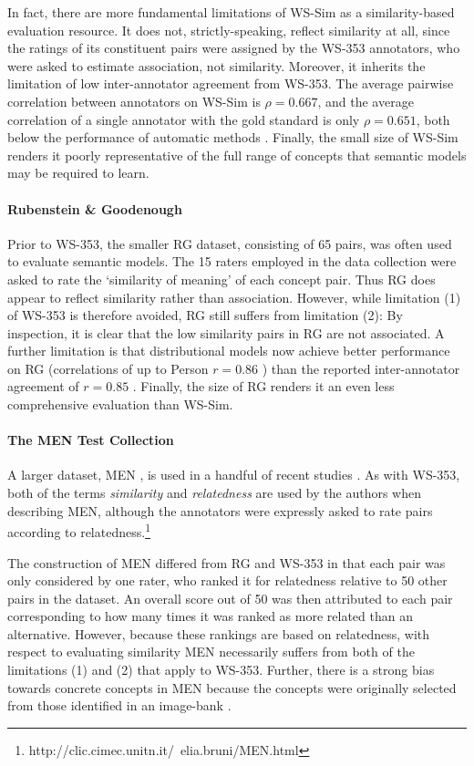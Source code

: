 In fact, there are more fundamental limitations of WS-Sim as a similarity-based evaluation resource. It does not, strictly-speaking, reflect similarity at all, since the ratings of its constituent pairs were assigned by the WS-353 annotators, who were asked to estimate association, not similarity. Moreover, it inherits the limitation of low inter-annotator agreement from WS-353. The average pairwise correlation between annotators on WS-Sim is \( \rho = 0.667\), and the average correlation of a single annotator with the gold standard is only \( \rho = 0.651\), both below the performance of automatic methods \cite{agirre2009study}. Finally, the small size of WS-Sim renders it poorly representative of the full range of concepts that semantic models may be required to learn. 

\paragraph{\bf Rubenstein \& Goodenough} Prior to WS-353, the smaller RG dataset, consisting of 65 pairs, was often used to evaluate semantic models. The 15 raters employed in the data collection were asked to rate the `similarity of meaning' of each concept pair. Thus RG does appear to reflect similarity rather than association. However, while limitation (1) of WS-353 is therefore avoided, RG still suffers from limitation (2): By inspection, it is clear that the low similarity pairs in RG are not associated. A further limitation is that distributional models now achieve better performance on RG (correlations of up to Person \( r = 0.86 \) \cite{hassan2011semantic}) than the reported inter-annotator agreement of \( r = 0.85 \) \cite{rubenstein1965contextual}. Finally, the size of RG renders it an even less comprehensive evaluation than WS-Sim. 

\paragraph{\bf The MEN Test Collection} A larger dataset, MEN \cite{bruni2012distributional}, is used in a handful of recent studies \cite{bruni2012distributional2,bernardi2013relatedness}. As with WS-353, both of the terms \emph{similarity} and \emph{relatedness} are used by the authors when describing MEN, although the annotators were expressly asked to rate pairs according to relatedness.\footnote{http://clic.cimec.unitn.it/~elia.bruni/MEN.html} 

The construction of MEN differed from RG and WS-353 in that each pair was only considered by one rater, who ranked it for relatedness relative to 50 other pairs in the dataset. An overall score out of 50 was then attributed to each pair corresponding to how many times it was ranked as more related than an alternative. However, because these rankings are based on relatedness, with respect to evaluating similarity MEN necessarily suffers from both of the limitations (1) and (2) that apply to WS-353. Further, there is a strong bias towards concrete concepts in MEN because the concepts were originally selected from those identified in an image-bank \cite{bruni2012distributional}.  

